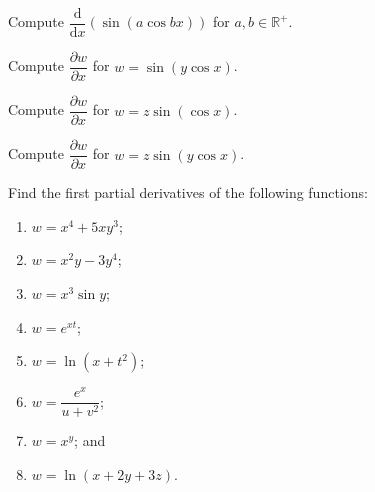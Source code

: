 \documentclass[11pt]{article}
\theoremstyle{break}
\newcommand{\differentiate}[1]{\dfrac{\dd}{\dd{#1}}}
\newcommand{\pderivative}[2]{\dfrac{\partial {#1}}{\partial {#2}}}
\newcommand{\dd}{\text{d}}
\newcommand{\bbR}{\mathbb{R}}
\numberwithin{equation}{theorem}
\begin{document}
\begin{example}
    Compute $\differentiate{x}\left(\sin\left(a\cos bx\right)\right)$ for $a, b\in\bbR^+$.
\end{example}
\vspace{8em}

\begin{example}
    Compute $\pderivative{w}{x}$ for $w=\sin\left(y\cos x\right)$.
\end{example}
\vspace{8em}

\begin{example}
    Compute $\pderivative{w}{x}$ for $w=z\sin\left(\cos x\right)$.
\end{example}
\vspace{8em}

\begin{example}
    Compute $\pderivative{w}{x}$ for $w=z\sin\left(y\cos x\right)$.
\end{example}
\vspace{8em}

\begin{example}
    Find the first partial derivatives of the following functions:
    \begin{enumerate}
        \item $w=x^4+5xy^3$;
        \item $w=x^2y-3y^4$;
        \item $w=x^3\sin y$;
        \item $w=e^{xt}$;
        \item $w=\ln(x+t^2)$;
        \item $w=\dfrac{e^x}{u+v^2}$;
        \item $w=x^y$; and
        \item $w=\ln(x+2y+3z)$.
    \end{enumerate}
\end{example}
\end{document}
